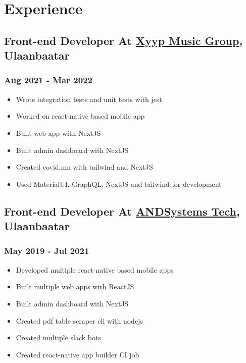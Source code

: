 \documentclass[letterpaper]{article}
\date{\today}
\title{}
\begin{document}

\section{Experience}
\label{sec:org17820f2}
\subsection{Front-end Developer At \href{https://xyyp.mn}{Xyyp Music Group}, Ulaanbaatar}
\label{sec:org2c5d84a}
\subsubsection{Aug 2021 - Mar 2022}
\label{sec:org062d8c0}
\begin{itemize}
\item Wrote integration tests and unit tests with jest
\item Worked on react-native based mobile app
\item Built web app with NextJS
\item Built admin dashboard with NextJS
\item Created covid.mn with tailwind and NextJS
\item Used MaterialUI, GraphQL, NextJS and tailwind for development
\end{itemize}
\subsection{Front-end Developer At \href{https://andsystems.net}{ANDSystems Tech}, Ulaanbaatar}
\label{sec:orgb5a2396}
\subsubsection{May 2019 - Jul 2021}
\label{sec:orge34a0b2}
\begin{itemize}
\item Developed multiple react-native based mobile apps
\item Built multiple web apps with ReactJS
\item Built admin dashboard with NextJS
\item Created pdf table scraper cli with nodejs
\item Created multiple slack bots
\item Created react-native app builder CI job
\end{itemize}
\end{document}
